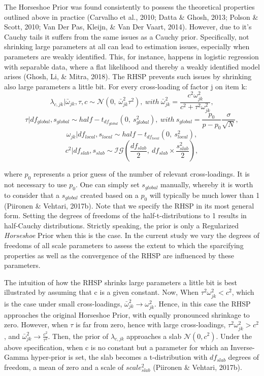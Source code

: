 \documentclass[
  man, donotrepeattitle,floatsintext]{apa6}
\begin{document}
The Horseshoe Prior was found consistently to possess the theoretical properties outlined above in practice (Carvalho et al., 2010; Datta \& Ghosh, 2013; Polson \& Scott, 2010; Van Der Pas, Kleijn, \& Van Der Vaart, 2014). However, due to it's Cauchy tails it suffers from the same issues as a Cauchy prior. Specifically, not shrinking large parameters at all can lead to estimation issues, especially when parameters are weakly identified. This, for instance, happens in logistic regression with separable data, where a flat likelihood and thereby a weakly identified model arises (Ghosh, Li, \& Mitra, 2018). The RHSP prevents such issues by shrinking also large parameters a little bit. For every cross-loading of factor j on item k:
\[\lambda_{c,jk} | \bar{\omega}_{jk}, \tau, c\sim \mathcal{N}(0, \ \bar{\omega}^2_{jk} \tau^2), \ with \ \bar{\omega}^2_{jk} = \frac{c^2\omega_{jk}^2}{c^2 + \tau^2 \omega_{jk}^2},\]
\[\tau | df_{global}, s_{global} \sim half-t_{df_{global}}(0,\  s_{global}^2), \ with \  s_{global} = \frac{p_0}{p-p_0}\frac{\sigma}{\sqrt{N}},\]
\[\omega_{jk}| df_{local}, s_{local} \sim half-t_{df_{local}}(0, \ s_{local}^2),\]
\[c^2 | df_{slab}, s_{slab} \sim \mathcal{IG}(\frac{df_{slab}}{2}, \  df_{slab} \times \frac{s_{slab}^2}{2}),\]

where \(p_0\) represents a prior guess of the number of relevant cross-loadings. It is not necessary to use \(p_0\). One can simply set \(s_{global}\) manually, whereby it is worth to consider that a \(s_{global}\) created based on a \(p_0\) will typically be much lower than 1 (Piironen \& Vehtari, 2017b). Note that we specify the RHSP in its most general form. Setting the degrees of freedoms of the half-t-distributions to 1 results in half-Cauchy distributions. Strictly speaking, the prior is only a Regularized \emph{Horseshoe} Prior when this is the case. In the current study we vary the degrees of freedoms of all scale parameters to assess the extent to which the sparcifying properties as well as the convergence of the RHSP are influenced by these parameters.

The intuition of how the RHSP shrinks large parameters a little bit is best illustrated by assuming that c is a given constant. Now, When \(\tau^2 \omega^2_{jk} < c^2\), which is the case under small cross-loadings, \(\bar{\omega}^2_{jk} \to \omega^2_{jk}\). Hence, in this case the RHSP approaches the original Horseshoe Prior, with equally pronounced shrinkage to zero. However, when \(\tau\) is far from zero, hence with large cross-loadings, \(\tau^2 \omega^2_{jk} > c^2\), and \(\bar{\omega}^2_{jk} \to \frac{c^2}{\tau^2}\). Then, the prior of \(\lambda_{c,jk}\) approaches a slab \(\mathcal{N}(0, c^2)\). Under the above specification, when c is no constant but a parameter for which an Inverse-Gamma hyper-prior is set, the slab becomes a t-distribution with \(df_{slab}\) degrees of freedom, a mean of zero and a scale of \(scale_{slab}^2\) (Piironen \& Vehtari, 2017b).
\end{document}
